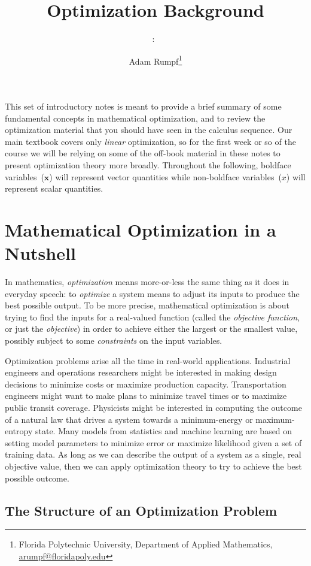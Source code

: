 \documentclass[11pt]{article}
\title{Optimization Background}
\author{\coursecode:~\courselong\\\semesterlong}
\date{Adam Rumpf\footnote{Florida Polytechnic University, Department of Applied Mathematics, \href{mailto:arumpf@floridapoly.edu}{arumpf@floridapoly.edu}}}
\theoremstyle{definition} %
\begin{document}
\maketitle

This set of introductory notes is meant to provide a brief summary of some fundamental concepts in mathematical optimization, and to review the optimization material that you should have seen in the calculus sequence. Our main textbook covers only \textit{linear} optimization, so for the first week or so of the course we will be relying on some of the off-book material in these notes to present optimization theory more broadly. Throughout the following, boldface variables~($\mathbf{x}$) will represent vector quantities while non-boldface variables~($x$) will represent scalar quantities.

\section{Mathematical Optimization in a Nutshell}
\label{sec:intro}

In mathematics, \textit{optimization} means more-or-less the same thing as it does in everyday speech: to \textit{optimize} a system means to adjust its inputs to produce the best possible output. To be more precise, mathematical optimization is about trying to find the inputs for a real-valued function (called the \textit{objective function}, or just the \textit{objective}) in order to achieve either the largest or the smallest value, possibly subject to some \textit{constraints} on the input variables.

Optimization problems arise all the time in real-world applications. Industrial engineers and operations researchers might be interested in making design decisions to minimize costs or maximize production capacity. Transportation engineers might want to make plans to minimize travel times or to maximize public transit coverage. Physicists might be interested in computing the outcome of a natural law that drives a system towards a minimum-energy or maximum-entropy state. Many models from statistics and machine learning are based on setting model parameters to minimize error or maximize likelihood given a set of training data. As long as we can describe the output of a system as a single, real objective value, then we can apply optimization theory to try to achieve the best possible outcome.

\subsection{The Structure of an Optimization Problem}
\label{subsec:structure}
\end{document}
